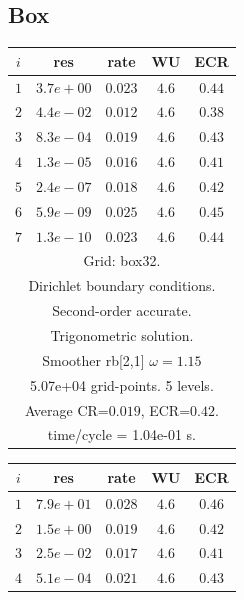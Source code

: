 \clearpage
\subsection{Box}

\begin{table}[hbt]
\begin{center}
\tablefontsize
\begin{tabular}{|c|c|c|c|c|} \hline 
 $i$   & res      & rate    &  WU    & ECR  \\   \hline 
 $ 1$  & $ 3.7e+00$ & $0.023$ & $ 4.6$ & $0.44$ \\ 
 $ 2$  & $ 4.4e-02$ & $0.012$ & $ 4.6$ & $0.38$ \\ 
 $ 3$  & $ 8.3e-04$ & $0.019$ & $ 4.6$ & $0.43$ \\ 
 $ 4$  & $ 1.3e-05$ & $0.016$ & $ 4.6$ & $0.41$ \\ 
 $ 5$  & $ 2.4e-07$ & $0.018$ & $ 4.6$ & $0.42$ \\ 
 $ 6$  & $ 5.9e-09$ & $0.025$ & $ 4.6$ & $0.45$ \\ 
 $ 7$  & $ 1.3e-10$ & $0.023$ & $ 4.6$ & $0.44$ \\ 
\hline 
\multicolumn{5}{|c|}{Grid: box32.}  \\
\multicolumn{5}{|c|}{Dirichlet boundary conditions.}  \\
\multicolumn{5}{|c|}{Second-order accurate.}  \\
\multicolumn{5}{|c|}{Trigonometric solution.}  \\
\multicolumn{5}{|c|}{Smoother rb[2,1] $\omega=1.15$}  \\
\multicolumn{5}{|c|}{5.07e+04 grid-points. 5 levels.}  \\
\multicolumn{5}{|c|}{Average CR=$0.019$, ECR=$0.42$.}  \\
\multicolumn{5}{|c|}{time/cycle = 1.04e-01 s.}  \\
\hline 
\end{tabular}
\begin{tabular}{|c|c|c|c|c|} \hline 
 $i$   & res      & rate    &  WU    & ECR  \\   \hline 
 $ 1$  & $ 7.9e+01$ & $0.028$ & $ 4.6$ & $0.46$ \\ 
 $ 2$  & $ 1.5e+00$ & $0.019$ & $ 4.6$ & $0.42$ \\ 
 $ 3$  & $ 2.5e-02$ & $0.017$ & $ 4.6$ & $0.41$ \\ 
 $ 4$  & $ 5.1e-04$ & $0.021$ & $ 4.6$ & $0.43$ \\ 

\end{tabular}
\end{center}
\end{table}
